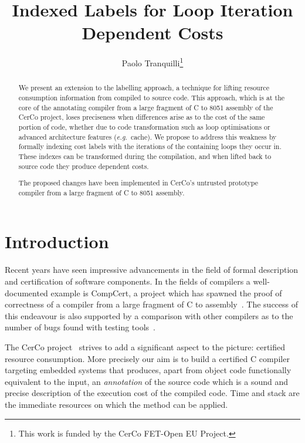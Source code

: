 \documentclass[submission,copyright,creativecommons]{eptcs}
\title{Indexed Labels for Loop Iteration Dependent Costs}
\author{Paolo Tranquilli\footnote{This work is funded by the CerCo FET-Open EU Project.}\institute{DISI (Dipartimento di Informatica -- Scienza e Ingegneria)\\Universit\`a di Bologna Alma Mater}\email{tranquil@cs.unibo.it}}
\theoremstyle{definition}
\newcommand{\eg}{\emph{e.g.\ }}
\begin{document}
\maketitle

\begin{abstract}
We present an extension to the labelling approach, a technique for lifting
resource consumption information from compiled to source code. This approach,
which is at the core of the annotating compiler from a large fragment of C to
8051 assembly of the CerCo project, loses preciseness when differences arise
as to the cost of the same portion of code, whether due to code transformation
such as loop optimisations or advanced architecture features (\eg cache). We
propose to address this weakness by formally indexing cost labels with the
iterations of the containing loops they occur in. These indexes can be
transformed during the compilation, and when lifted back to source code they
produce dependent costs.

The proposed changes have been implemented in CerCo's untrusted prototype
compiler from a large fragment of C to 8051 assembly.
\end{abstract}
\listoftodos

\section{Introduction}
\label{sec:intro}
Recent years have seen impressive advancements in the field of formal description
and certification of software components. In the fields of compilers a well-documented
example is CompCert, a project which has spawned the proof of correctness of a
compiler from a large fragment of C to assembly~\cite{CompCert}. The success
of this endeavour is also supported by a comparison with other compilers as
to the number of bugs found with testing tools~\cite{findingbugs}.

The CerCo project~\cite{cerco} strives to add a significant aspect to the
picture: certified resource consumption. More precisely our aim is to build
a certified C compiler targeting embedded systems that produces, apart
from object code functionally equivalent to the input, an \emph{annotation} of the
source code which is a sound and precise
description of the execution cost of the compiled code. Time and stack are the
immediate resources on which the method can be applied.
\end{document}
